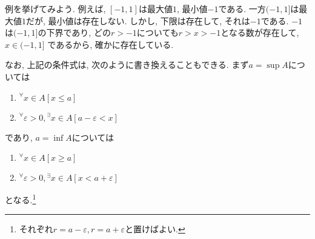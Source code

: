         例を挙げてみよう. 例えば, $[-1,1]$は最大値$1$, 最小値$-1$である. 一方$(-1,1]$は最大値$1$だが, 最小値は存在しない.
        しかし, 下限は存在して, それは$-1$である. $-1$は$(-1,1]$の下界であり, どの$r>-1$についても$r>x>-1$となる数が存在して, $x\in (-1,1]$
        であるから, 確かに存在している.

        なお, 上記の条件式は, 次のように書き換えることもできる. まず$a=\sup A$については
        \begin{enumerate}
            \item $^\forall x\in A \left[x\leq a\right]$
            \item $^\forall \varepsilon>0,{}^\exists x\in A \left[a-\varepsilon < x\right]$
        \end{enumerate}
        であり, $a=\inf A$については
        \begin{enumerate}
            \item $^\forall x\in A \left[x\geq a\right]$
            \item $^\forall \varepsilon>0,{}^\exists x\in A \left[x < a+\varepsilon\right]$
        \end{enumerate}
        となる.\footnote{それぞれ$r=a-\varepsilon,r=a+\varepsilon$と置けばよい.}

